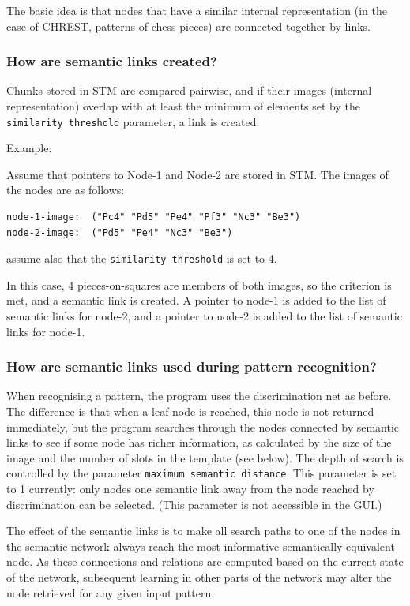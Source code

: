\documentclass{article}
\begin{document}
The basic idea is that nodes that have a similar internal representation (in the case
of CHREST, patterns of chess pieces) are connected together by links. 

\subsubsection{How are semantic links created?}

Chunks stored in STM are compared pairwise, and if their images 
(internal representation) overlap with at least the minimum of elements set
by the {\tt similarity threshold} parameter, a link is created.

Example:

Assume that pointers to Node-1 and Node-2 are stored in STM. The images of the
nodes are as follows:

\begin{verbatim}
node-1-image:  ("Pc4" "Pd5" "Pe4" "Pf3" "Nc3" "Be3")
node-2-image:  ("Pd5" "Pe4" "Nc3" "Be3")
\end{verbatim}

assume also that the {\tt similarity threshold} is set to 4.

In this case, 4 pieces-on-squares are members of both images, so the criterion 
is met, and a semantic link is created. A pointer to node-1 is added to 
the list of semantic links for node-2, and a pointer to node-2 is added to 
the list of semantic links for node-1.

\subsubsection{How are semantic links used during pattern recognition?}

When recognising a pattern, the program uses the discrimination net as before.
The difference is that when a leaf node is reached, this node is not returned
immediately, but the program searches through the nodes connected by semantic
links to see if some node has richer information, as calculated by the size of
the image and the number of slots in the template (see below). The depth of
search is controlled by the parameter {\tt maximum semantic distance}. This
parameter is set to 1 currently: only nodes one semantic link away from the
node reached by discrimination can be selected.  (This parameter is not
accessible in the GUI.)

The effect of the semantic links is to make all search paths to one of the
nodes in the semantic network always reach the most informative
semantically-equivalent node.  As these connections and relations are computed
based on the current state of the network, subsequent learning in other parts 
of the network may alter the node retrieved for any given input pattern.
\end{document}
